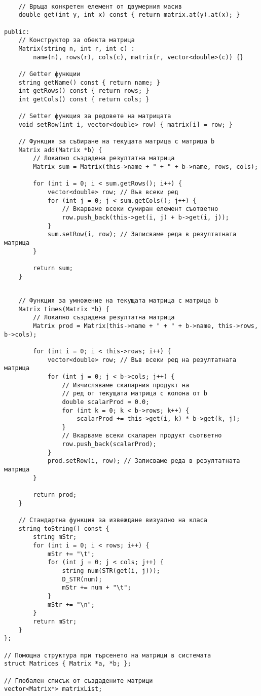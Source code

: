 \documentclass[oneside]{book}
\begin{document}
\begin{mdframed}\begin{lstlisting}[firstnumber=last]

	// Връща конкретен елемент от двумерния масив
	double get(int y, int x) const { return matrix.at(y).at(x); }

public:
	// Конструктор за обекта матрица
	Matrix(string n, int r, int c) :
        name(n), rows(r), cols(c), matrix(r, vector<double>(c)) {}

	// Getter функции
	string getName() const { return name; }
	int getRows() const { return rows; }
	int getCols() const { return cols; }

	// Setter функция за редовете на матрицата
	void setRow(int i, vector<double> row) { matrix[i] = row; }

	// Функция за събиране на текущата матрица с матрица b
	Matrix add(Matrix *b) {
		// Локално създадена резултатна матрица
		Matrix sum = Matrix(this->name + " + " + b->name, rows, cols);
    
		for (int i = 0; i < sum.getRows(); i++) {
			vector<double> row; // Във всеки ред
			for (int j = 0; j < sum.getCols(); j++) {
				// Вкарваме всеки сумиран елемент съответно
				row.push_back(this->get(i, j) + b->get(i, j));
			}
			sum.setRow(i, row); // Записваме реда в резултатната матрица
		}

		return sum;
	}
\end{lstlisting}\end{mdframed}
\pagebreak
\begin{mdframed}\begin{lstlisting}[firstnumber=last]

	// Функция за умножение на текущата матрица с матрица b
	Matrix times(Matrix *b) {
		// Локално създадена резултатна матрица
		Matrix prod = Matrix(this->name + " + " + b->name, this->rows, b->cols);

		for (int i = 0; i < this->rows; i++) {
			vector<double> row; // Във всеки ред на резултатната матрица
			for (int j = 0; j < b->cols; j++) {
				// Изчисляваме скаларния продукт на
				// ред от текущата матрица с колона от b
				double scalarProd = 0.0;
				for (int k = 0; k < b->rows; k++) {
					scalarProd += this->get(i, k) * b->get(k, j);
				}
				// Вкарваме всеки скаларен продукт съответно
				row.push_back(scalarProd);
			}
			prod.setRow(i, row); // Записваме реда в резултатната матрица
		}

		return prod;
	}

	// Стандартна функция за извеждане визуално на класа
	string toString() const {
		string mStr;
		for (int i = 0; i < rows; i++) {
			mStr += "\t";
			for (int j = 0; j < cols; j++) {
				string num(STR(get(i, j)));
				D_STR(num);
				mStr += num + "\t";
			}
			mStr += "\n";
		}
		return mStr;
	}
};

// Помощна структура при търсенето на матрици в системата
struct Matrices { Matrix *a, *b; };

// Глобален списък от създадените матрици
vector<Matrix*> matrixList;
\end{lstlisting}\end{mdframed}\vspace{-12pt}
\end{document}
